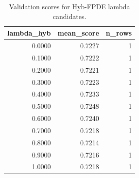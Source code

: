 \begin{table}[t]
\caption{Validation scores for Hyb-FPDE lambda candidates.}
\label{tab:lambda_distribution_computed}
\centering
\begin{tabular}{rrr}
\toprule
lambda\_hyb & mean\_score & n\_rows \\
\midrule
0.0000 & 0.7227 & 1 \\
0.1000 & 0.7222 & 1 \\
0.2000 & 0.7221 & 1 \\
0.3000 & 0.7223 & 1 \\
0.4000 & 0.7233 & 1 \\
0.5000 & 0.7248 & 1 \\
0.6000 & 0.7240 & 1 \\
0.7000 & 0.7218 & 1 \\
0.8000 & 0.7214 & 1 \\
0.9000 & 0.7216 & 1 \\
1.0000 & 0.7218 & 1 \\
\bottomrule
\end{tabular}

\end{table}
